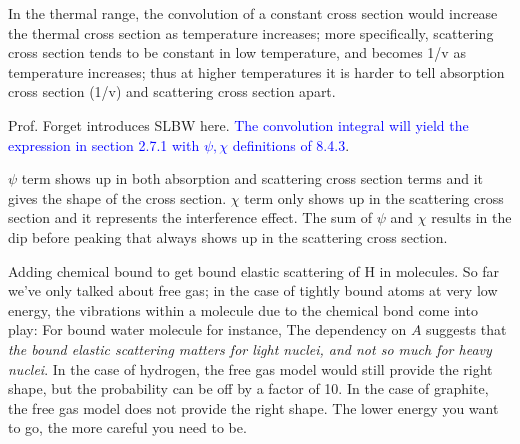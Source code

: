 \documentclass{school-22.211-notes}
\begin{document}
In the thermal range, the convolution of a constant cross section would increase the thermal cross section as temperature increases; more specifically, scattering cross section tends to be constant in low temperature, and becomes 1/v as temperature increases; thus at higher temperatures it is harder to tell absorption cross section (1/v) and scattering cross section apart. 

Prof. Forget introduces SLBW here. \textcolor{blue}{The convolution integral will yield the expression in section 2.7.1 with $\psi, \chi$ definitions of 8.4.3}. 

$\psi$ term shows up in both absorption and scattering cross section terms and it gives the shape of the cross section. $\chi$ term only shows up in the scattering cross section and it represents the interference effect. The sum of $\psi$ and $\chi$ results in the dip before peaking that always shows up in the scattering cross section. 

\clearpage
{}
Adding chemical bound to get bound elastic scattering of H in  molecules. So far we've only talked about free gas; in the case of tightly bound atoms at very low energy, the vibrations within a molecule due to the chemical bond come into play:
  For bound water molecule for instance, 
  The dependency on $A$ suggests that \textit{the bound elastic scattering matters for light nuclei, and not so much for heavy nuclei}. In the case of hydrogen, the free gas model would still provide the right shape, but the probability can be off by a factor of 10. In the case of graphite, the free gas model does not provide the right shape. The lower energy you want to go, the more careful you need to be. 
\end{document}
